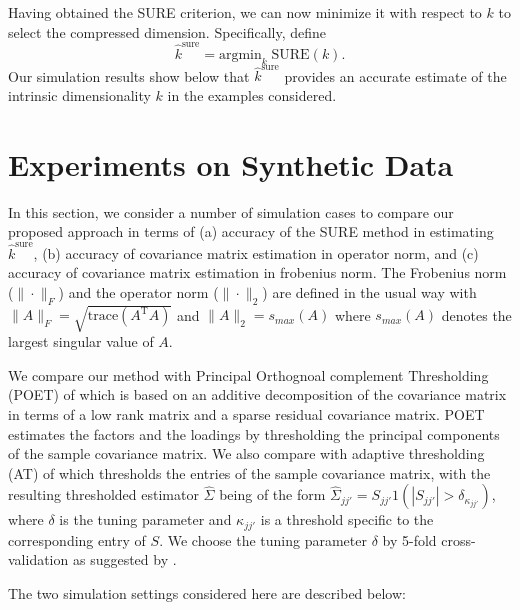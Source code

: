 \documentclass[11pt,oneside]{amsart}
\def\T{{\mathrm{\scriptscriptstyle T}}}
\begin{document}
Having obtained the SURE criterion, we can now minimize it with respect to $k$ to select the compressed dimension. Specifically, define
\begin{equation} 
{\widehat{k}}^{\text{sure}} = {\mbox{argmin}}_k\; \mbox{SURE}(k). 
\end{equation}
Our simulation results show below that ${\widehat{k}^{\text{sure}}}$ provides an accurate estimate of the intrinsic dimensionality $k$ in the examples considered. 
\section{Experiments on Synthetic Data} \label{Experiments}
In this section, we consider a number of simulation cases to compare our proposed approach in terms of (a) accuracy of the SURE method in estimating $\widehat{k}^{\text{sure}}$, (b) accuracy of covariance matrix estimation in operator norm, and (c) accuracy of covariance matrix estimation in frobenius norm. The Frobenius norm ($\|\cdot\|_{F}$) and the operator norm ($\| \cdot \|_{2}$) are defined in the usual way with $\|A\|_{F} = \sqrt{\mbox{trace}(A^{\T}A)}$ and $\|A\|_{2} = s_{{max}}(A)$ where $s_{{max}}(A)$ denotes the largest singular value of $A$. 

We compare our method with Principal Orthognoal complement Thresholding (POET) of \citet{fan2013large} which is based on an additive decomposition of the covariance matrix in terms of a low rank matrix and a sparse residual covariance matrix. POET estimates the factors and the loadings by thresholding the principal components of the sample covariance matrix. We also compare with adaptive thresholding (AT) of \citet{cai2011adaptive} which thresholds the entries of the sample covariance matrix, with the resulting thresholded estimator ${\widehat{\Sigma}}$ being of the form ${\widehat{\Sigma}}_{jj'} = S_{jj'}1(|S_{jj'}| > {\delta_{\kappa_{jj'}}})$, where $\delta$ is the tuning parameter and $\kappa_{jj'}$ is a threshold specific to the corresponding entry of $S$. We choose the tuning parameter $\delta$ by 5-fold cross-validation as suggested by \citet{cai2011adaptive}. 

The two simulation settings considered here are described below: 
\end{document}

